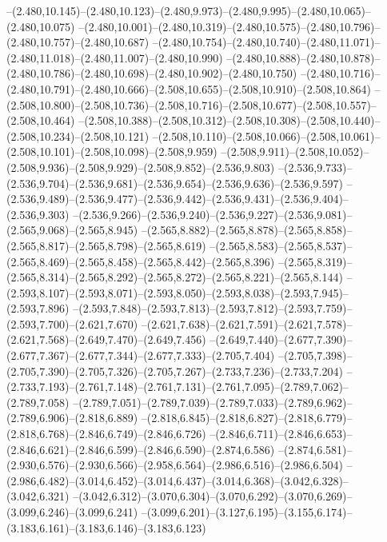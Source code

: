   --(2.480,10.145)--(2.480,10.123)--(2.480,9.973)--(2.480,9.995)--(2.480,10.065)--(2.480,10.075)%
  --(2.480,10.001)--(2.480,10.319)--(2.480,10.575)--(2.480,10.796)--(2.480,10.757)--(2.480,10.687)%
  --(2.480,10.754)--(2.480,10.740)--(2.480,11.071)--(2.480,11.018)--(2.480,11.007)--(2.480,10.990)%
  --(2.480,10.888)--(2.480,10.878)--(2.480,10.786)--(2.480,10.698)--(2.480,10.902)--(2.480,10.750)%
  --(2.480,10.716)--(2.480,10.791)--(2.480,10.666)--(2.508,10.655)--(2.508,10.910)--(2.508,10.864)%
  --(2.508,10.800)--(2.508,10.736)--(2.508,10.716)--(2.508,10.677)--(2.508,10.557)--(2.508,10.464)%
  --(2.508,10.388)--(2.508,10.312)--(2.508,10.308)--(2.508,10.440)--(2.508,10.234)--(2.508,10.121)%
  --(2.508,10.110)--(2.508,10.066)--(2.508,10.061)--(2.508,10.101)--(2.508,10.098)--(2.508,9.959)%
  --(2.508,9.911)--(2.508,10.052)--(2.508,9.936)--(2.508,9.929)--(2.508,9.852)--(2.536,9.803)%
  --(2.536,9.733)--(2.536,9.704)--(2.536,9.681)--(2.536,9.654)--(2.536,9.636)--(2.536,9.597)%
  --(2.536,9.489)--(2.536,9.477)--(2.536,9.442)--(2.536,9.431)--(2.536,9.404)--(2.536,9.303)%
  --(2.536,9.266)--(2.536,9.240)--(2.536,9.227)--(2.536,9.081)--(2.565,9.068)--(2.565,8.945)%
  --(2.565,8.882)--(2.565,8.878)--(2.565,8.858)--(2.565,8.817)--(2.565,8.798)--(2.565,8.619)%
  --(2.565,8.583)--(2.565,8.537)--(2.565,8.469)--(2.565,8.458)--(2.565,8.442)--(2.565,8.396)%
  --(2.565,8.319)--(2.565,8.314)--(2.565,8.292)--(2.565,8.272)--(2.565,8.221)--(2.565,8.144)%
  --(2.593,8.107)--(2.593,8.071)--(2.593,8.050)--(2.593,8.038)--(2.593,7.945)--(2.593,7.896)%
  --(2.593,7.848)--(2.593,7.813)--(2.593,7.812)--(2.593,7.759)--(2.593,7.700)--(2.621,7.670)%
  --(2.621,7.638)--(2.621,7.591)--(2.621,7.578)--(2.621,7.568)--(2.649,7.470)--(2.649,7.456)%
  --(2.649,7.440)--(2.677,7.390)--(2.677,7.367)--(2.677,7.344)--(2.677,7.333)--(2.705,7.404)%
  --(2.705,7.398)--(2.705,7.390)--(2.705,7.326)--(2.705,7.267)--(2.733,7.236)--(2.733,7.204)%
  --(2.733,7.193)--(2.761,7.148)--(2.761,7.131)--(2.761,7.095)--(2.789,7.062)--(2.789,7.058)%
  --(2.789,7.051)--(2.789,7.039)--(2.789,7.033)--(2.789,6.962)--(2.789,6.906)--(2.818,6.889)%
  --(2.818,6.845)--(2.818,6.827)--(2.818,6.779)--(2.818,6.768)--(2.846,6.749)--(2.846,6.726)%
  --(2.846,6.711)--(2.846,6.653)--(2.846,6.621)--(2.846,6.599)--(2.846,6.590)--(2.874,6.586)%
  --(2.874,6.581)--(2.930,6.576)--(2.930,6.566)--(2.958,6.564)--(2.986,6.516)--(2.986,6.504)%
  --(2.986,6.482)--(3.014,6.452)--(3.014,6.437)--(3.014,6.368)--(3.042,6.328)--(3.042,6.321)%
  --(3.042,6.312)--(3.070,6.304)--(3.070,6.292)--(3.070,6.269)--(3.099,6.246)--(3.099,6.241)%
  --(3.099,6.201)--(3.127,6.195)--(3.155,6.174)--(3.183,6.161)--(3.183,6.146)--(3.183,6.123)%
